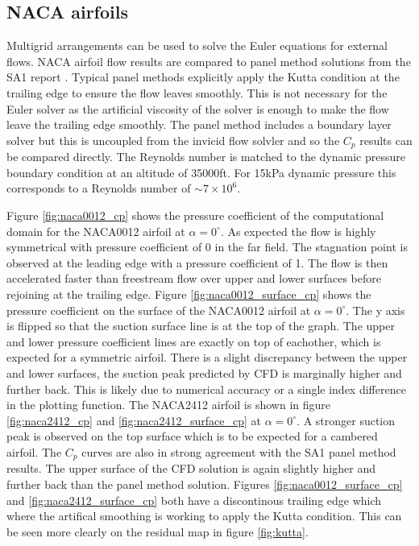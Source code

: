 \documentclass{article}
\begin{document}
\subsection{NACA airfoils}

Multigrid arrangements can be used to solve the Euler equations for external flows.
NACA airfoil flow results are compared to panel method solutions from the SA1 report \cite{SA1}.
Typical panel methods explicitly apply the Kutta condition at the trailing edge to ensure the flow leaves smoothly.
This is not necessary for the Euler solver as the artificial viscosity of the solver is enough to make the flow leave the trailing edge smoothly.
The panel method includes a boundary layer solver but this is uncoupled from the invicid flow solvler and so the $C_p$ results can be compared directly.
The Reynolds number is matched to the dynamic pressure boundary condition at an altitude of 35000ft.
For 15kPa dynamic pressure this corresponds to a Reynolds number of $\sim7\times10^6$.

Figure \ref{fig:naca0012_cp} shows the pressure coefficient of the computational domain for the NACA0012 airfoil at $\alpha = 0^\circ$.
As expected the flow is highly symmetrical with pressure coefficient of 0 in the far field. The stagnation point is observed at the leading edge with a pressure coefficient of 1.
The flow is then accelerated faster than freestream flow over upper and lower surfaces before rejoining at the trailing edge.
Figure \ref{fig:naca0012_surface_cp} shows the pressure coefficient on the surface of the NACA0012 airfoil at $\alpha = 0^\circ$.
The y axis is flipped so that the suction surface line is at the top of the graph.
The upper and lower pressure coefficient lines are exactly on top of eachother, which is expected for a symmetric airfoil.
There is a slight discrepancy between the upper and lower surfaces, the suction peak predicted by CFD is marginally higher and further back.
This is likely due to numerical accuracy or a single index difference in the plotting function.
The NACA2412 airfoil is shown in figure \ref{fig:naca2412_cp} and \ref{fig:naca2412_surface_cp} at $\alpha = 0^\circ$.
A stronger suction peak is observed on the top surface which is to be expected for a cambered airfoil.
The $C_p$ curves are also in strong agreement with the SA1 panel method results.
The upper surface of the CFD solution is again slightly higher and further back than the panel method solution.
Figures \ref{fig:naca0012_surface_cp} and \ref{fig:naca2412_surface_cp} both have a discontinous trailing edge which where the artifical smoothing 
is working to apply the Kutta condition. This can be seen more clearly on the residual map in figure \ref{fig:kutta}.
\end{document}
